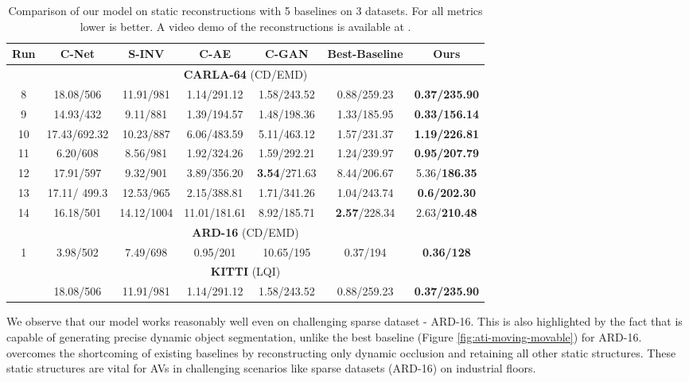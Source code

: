  \begin{table}[htbp]
\scriptsize
    \centering
    \begin{tabular}{|c|c|c|c|c|c|c|}

    \hline
     Run & C-Net         & S-INV        & C-AE         & C-GAN       &  Best-Baseline       & Ours        
\\ \hline
\multicolumn{7}{|c|}{\textbf{CARLA-64} (CD/EMD)} \\ \hline

 8 & 18.08/506        & 11.91/981  & 1.14/291.12  & 1.58/243.52 &  0.88/259.23 & \textbf{0.37/235.90} \\ \cline{1-7} 
 9 & 14.93/432     & 9.11/881   & 1.39/194.57  & 1.48/198.36 &  1.33/185.95 & \textbf{0.33/156.14}  \\ \cline{1-7} 
 10 & 17.43/692.32 & 10.23/887  & 6.06/483.59  & 5.11/463.12 &  1.57/231.37 & \textbf{1.19/226.81} \\ \cline{1-7} 
 11 & 6.20/608     & 8.56/981   & 1.92/324.26  & 1.59/292.21 &  1.24/239.97 & \textbf{0.95/207.79} \\ \cline{1-7} 
 12   & 17.91/597    & 9.32/901   & 3.89/356.20  & \textbf{3.54}/271.63 &  8.44/206.67 & 5.36/\textbf{186.35} \\ \cline{1-7} 
 13  &17.11/ 499.3  & 12.53/965  & 2.15/388.81  & 1.71/341.26 &  1.04/243.74 & \textbf{0.6/202.30}  \\ \cline{1-7} 
 14  &  16.18/501    & 14.12/1004 & 11.01/181.61 & 8.92/185.71 & \textbf{2.57}/228.34 & 2.63/\textbf{210.48}  \\ \hline
\multicolumn{7}{|c|}{\textbf{ARD-16} (CD/EMD)} \\ \hline

 1& 3.98/502     & 7.49/698  & 0.95/201  & 10.65/195 &  0.37/194 & \textbf{0.36/128} \\ \hline
\multicolumn{7}{|c|}{\textbf{KITTI} (LQI)} \\ \hline
 & 18.08/506        & 11.91/981  & 1.14/291.12  & 1.58/243.52 &  0.88/259.23 & \textbf{0.37/235.90} \\ \hline

    \end{tabular}
    \caption{Comparison of our model on static reconstructions with
5 baselines on 3 datasets. For all metrics lower is better. A video demo of the reconstructions is available at \cite{url1}.  }
    \label{tab:carlaresults}
    \end{table}


We observe that our model works reasonably well even on
challenging sparse dataset - ARD-16. This is also highlighted by the fact that
\dslr{} is capable of generating precise dynamic object segmentation, unlike the best baseline (Figure \ref{fig:ati-moving-movable}) for ARD-16. \dslr{} overcomes the shortcoming of existing baselines by reconstructing only dynamic occlusion and retaining all other static structures. These static structures are vital for AVs in challenging scenarios like sparse datasets (ARD-16) on industrial floors.


